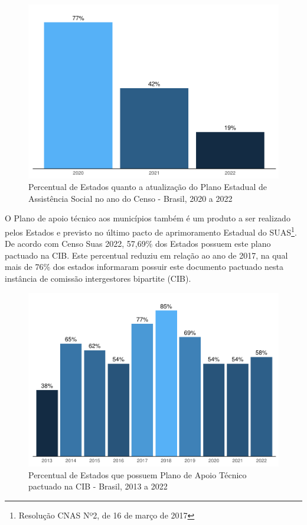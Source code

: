 \documentclass[
  brazilian]{report}
\begin{document}
\begin{figure}
\includegraphics{Censo-SUAS-2022_files/figure-latex/PEAS-1} \caption[Percentual de Estados quanto a atualização do Plano Estadual de Assistência Social no ano do Censo - Brasil, 2020 a 2022]{Percentual de Estados quanto a atualização do Plano Estadual de Assistência Social no ano do Censo - Brasil, 2020 a 2022}\label{fig:PEAS}
\end{figure}

O Plano de apoio técnico aos municípios também é um produto a ser
realizado pelos Estados e previsto no último pacto de aprimoramento
Estadual do SUAS\footnote{Resolução CNAS Nº2, de 16 de março de 2017}.
De acordo com Censo Suas 2022, 57,69\% dos Estados possuem este plano
pactuado na CIB. Este percentual reduziu em relação ao ano de 2017, na
qual mais de 76\% dos estados informaram possuir este documento pactuado
nesta instância de comissão intergestores bipartite (CIB).

\begin{figure}
\includegraphics{Censo-SUAS-2022_files/figure-latex/plan_apoio_tec-1} \caption[Percentual de Estados que possuem Plano de Apoio Técnico pactuado na CIB - Brasil, 2013 a 2022]{Percentual de Estados que possuem Plano de Apoio Técnico pactuado na CIB - Brasil, 2013 a 2022}\label{fig:plan_apoio_tec}
\end{figure}
\end{document}
